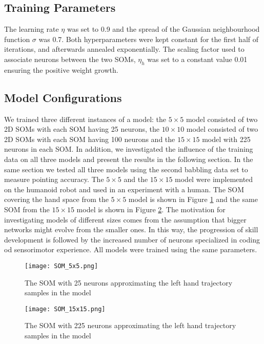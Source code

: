 \subsection{Training Parameters}
The learning rate $\eta$ was set to 0.9 and the spread of the Gaussian neighbourhood function $\sigma$ was 0.7. Both hyperparameters were kept constant for the first half of iterations, and afterwards annealed exponentially. The scaling factor used to associate neurons between the two SOMs, $\eta_h$ was set to a constant value 0.01 ensuring the positive weight growth.\\

\subsection{Model Configurations}
We trained three different instances of a model: the $5\times 5$ model consisted of two 2D SOMs with each SOM having 25 neurons, the $10\times 10$ model consisted of two 2D SOMs with each SOM having 100 neurons and the $15\times 15$ model with 225 neurons in each SOM. In addition, we investigated the influence of the training data on all three models and present the results in the following section. In the same section we tested all three models using the second babbling data set to measure pointing accuracy.
The $5\times 5$ and the $15\times 15$ model were implemented on the humanoid robot and used in an experiment with a human. The SOM covering the hand space from the $5\times 5$ model is shown in Figure \ref{lab:5x5} and the same SOM from the $15\times 15$ model is shown in Figure \ref{lab:15x15}. 
The motivation for investigating models of different sizes comes from the assumption that bigger networks might evolve from the smaller ones. In this way, the progression of skill development is followed by the increased number of neurons specialized in coding od sensorimotor experience. All models were trained using the same parameters.

\begin{figure}[t]
\centering
\texttt{[image: SOM\_5x5.png]}

\caption{The SOM with 25 neurons approximating the left hand trajectory samples in the \ssom model}
\label{lab:5x5}
\end{figure}

\begin{figure}[t]
\centering
\texttt{[image: SOM\_15x15.png]}
\caption{The SOM with 225 neurons approximating the left hand trajectory samples in the \bsom model}
\label{lab:15x15}
\end{figure}

